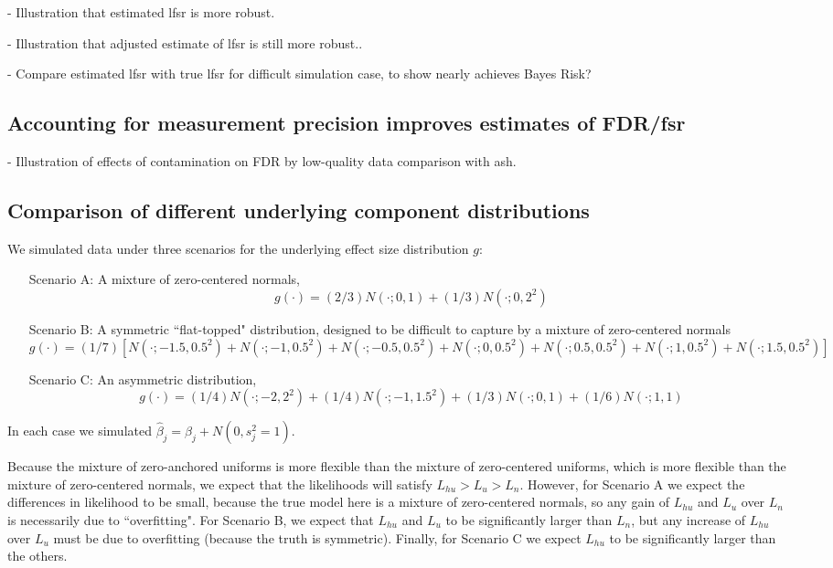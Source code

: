\documentclass[11pt]{article}
\def\bhat{\hat{\beta}}
\begin{document}
- Illustration that estimated lfsr is more robust.

- Illustration that adjusted estimate of lfsr is still more robust..

- Compare estimated lfsr with true lfsr for difficult simulation case, to show nearly achieves Bayes Risk?

\subsection{Accounting for measurement precision improves estimates of FDR/fsr}
 
- Illustration of effects of contamination on FDR by low-quality data
comparison with ash.



\subsection{Comparison of different underlying component distributions}

We simulated data under three scenarios for the underlying effect size distribution $g$:
\begin{enumerate}
\item[Scenario A:]
A mixture of zero-centered normals,
\begin{equation}
g(\cdot) =  (2/3) N(\cdot; 0,1) + (1/3) N(\cdot; 0, 2^2)
\end{equation}
\item[Scenario B:]
A symmetric ``flat-topped" distribution, designed to be difficult to capture by a mixture of zero-centered normals 
\begin{equation}
g(\cdot) = (1/7) [N(\cdot; -1.5, 0.5^2) + N(\cdot; -1, 0.5^2) + N(\cdot; -0.5, 0.5^2) + N(\cdot; 0, 0.5^2) + N(\cdot; 0.5, 0.5^2) + N(\cdot; 1, 0.5^2) + N(\cdot; 1.5, 0.5^2)]
\end{equation}
\item[Scenario C:]
An asymmetric distribution, 
\begin{equation}
g(\cdot) = (1/4) N(\cdot; -2 ,2^2) + (1/4) N(\cdot; -1 ,1.5^2) + (1/3) N(\cdot; 0 ,1) + (1/6) N(\cdot; 1,1) 
\end{equation}
\end{enumerate}
In each case we simulated $\bhat_j  = \beta_j + N(0,s^2_j=1)$.

Because the mixture of zero-anchored uniforms is more flexible than the mixture of zero-centered uniforms, which is more flexible
than the mixture of zero-centered normals, we expect that the likelihoods will satisfy $L_{hu} > L_u > L_n$. However, for Scenario A we expect the differences in
likelihood to be small, because the true model here is a mixture of zero-centered normals, so any gain of $L_{hu}$ and $L_u$ over $L_n$ is necessarily due to ``overfitting".
For Scenario B, we expect that $L_{hu}$ and $L_{u}$ to be significantly larger than $L_n$, but any 
increase of $L_{hu}$ over $L_u$ must be due to overfitting (because the truth is symmetric). Finally, for Scenario C we
expect $L_{hu}$ to be significantly larger than the others.
\end{document}
